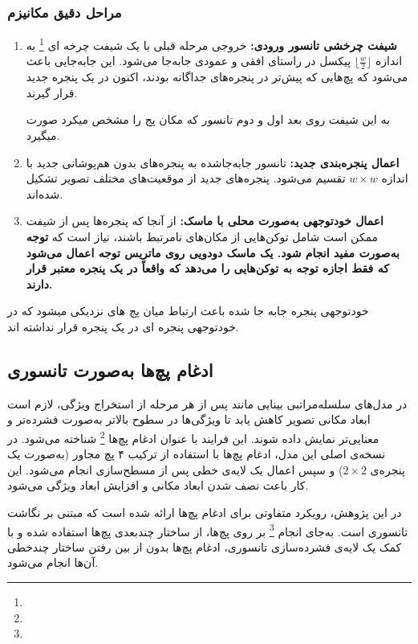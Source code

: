 \subsubsection*{مراحل دقیق مکانیزم }

\begin{enumerate}
	\item \textbf{شیفت چرخشی تانسور ورودی:} خروجی مرحله قبلی  با یک  شیفت چرخه ای 
	\footnote{} به اندازه $\lfloor \frac{w}{2} \rfloor$ پیکسل در راستای افقی و عمودی جابه‌جا می‌شود. این جابه‌جایی باعث می‌شود که پچ‌هایی که پیش‌تر در پنجره‌های جداگانه بودند، اکنون در یک پنجره جدید قرار گیرند.
	
	به این شیفت روی بعد اول و دوم تانسور که مکان پج را مشخص میکرد صورت میگیرد.
	
	\item \textbf{اعمال پنجره‌بندی جدید:} تانسور جابه‌جا‌شده به پنجره‌های بدون هم‌پوشانی جدید با اندازه $w \times w$ تقسیم می‌شود. پنجره‌های جدید از موقعیت‌های مختلف تصویر تشکیل شده‌اند.
	
	\item \textbf{اعمال خودتوجهی به‌صورت محلی با ماسک:} از آنجا که پنجره‌ها پس از شیفت ممکن است شامل توکن‌هایی از مکان‌های نامرتبط باشند، نیاز است که \textbf{توجه به‌صورت مفید  انجام شود. یک ماسک دودویی روی ماتریس توجه اعمال می‌شود که فقط اجازه توجه به توکن‌هایی را می‌دهد که واقعاً در یک پنجره معتبر قرار دارند.}
	
\end{enumerate}



خودتوجهی پنجره جابه جا شده باعث ارتباط میان پج های نزدیکی میشود که در خودتوجهی پنجره ای در یک پنجره قرار نداشته اند. 



\subsection{ادغام پچ‌ها به‌صورت تانسوری}

در مدل‌های سلسله‌مراتبی بینایی مانند پس از هر مرحله از استخراج ویژگی، لازم است ابعاد مکانی تصویر کاهش یابد تا ویژگی‌ها در سطوح بالاتر به‌صورت فشرده‌تر و معنایی‌تر نمایش داده شوند. این فرایند با عنوان ادغام پچ‌ها \footnote{} شناخته می‌شود. در نسخه‌ی اصلی این مدل، ادغام پچ‌ها با استفاده از ترکیب ۴ پچ مجاور (به‌صورت یک پنجره‌ی $2 \times 2$) و سپس اعمال یک لایه‌ی خطی پس از مسطح‌سازی انجام می‌شود. این کار باعث نصف شدن ابعاد مکانی و افزایش ابعاد ویژگی می‌شود.

در این پژوهش، رویکرد متفاوتی برای ادغام پچ‌ها ارائه شده است که مبتنی بر نگاشت تانسوری است. به‌جای انجام \footnote{} بر روی پچ‌ها، از ساختار چندبعدی پچ‌ها استفاده شده و با کمک یک لایه‌ی فشرده‌سازی تانسوری، ادغام پچ‌ها بدون از بین رفتن ساختار چندخطی آن‌ها انجام می‌شود.

